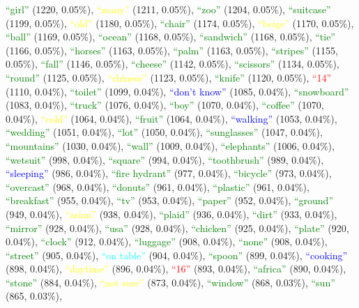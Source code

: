 {\textcolor{green}{``girl''}} (1220, 0.05\%), {\textcolor{yellow}{``many''}} (1211, 0.05\%), {\textcolor{green}{``zoo''}} (1204, 0.05\%), {\textcolor{green}{``suitcase''}} (1199, 0.05\%), {\textcolor{yellow}{``old''}} (1180, 0.05\%), {\textcolor{green}{``chair''}} (1174, 0.05\%), {\textcolor{yellow}{``beige''}} (1170, 0.05\%), {\textcolor{green}{``ball''}} (1169, 0.05\%), {\textcolor{green}{``ocean''}} (1168, 0.05\%), {\textcolor{green}{``sandwich''}} (1168, 0.05\%), {\textcolor{green}{``tie''}} (1166, 0.05\%), {\textcolor{green}{``horses''}} (1163, 0.05\%), {\textcolor{green}{``palm''}} (1163, 0.05\%), {\textcolor{green}{``stripes''}} (1155, 0.05\%), {\textcolor{green}{``fall''}} (1146, 0.05\%), {\textcolor{green}{``cheese''}} (1142, 0.05\%), {\textcolor{green}{``scissors''}} (1134, 0.05\%), {\textcolor{green}{``round''}} (1125, 0.05\%), {\textcolor{yellow}{``chinese''}} (1123, 0.05\%), {\textcolor{green}{``knife''}} (1120, 0.05\%), {\textcolor{red}{``14''}} (1110, 0.04\%), {\textcolor{green}{``toilet''}} (1099, 0.04\%), {\textcolor{blue}{``don't know''}} (1085, 0.04\%), {\textcolor{green}{``snowboard''}} (1083, 0.04\%), {\textcolor{green}{``truck''}} (1076, 0.04\%), {\textcolor{green}{``boy''}} (1070, 0.04\%), {\textcolor{green}{``coffee''}} (1070, 0.04\%), {\textcolor{yellow}{``cold''}} (1064, 0.04\%), {\textcolor{green}{``fruit''}} (1064, 0.04\%), {\textcolor{blue}{``walking''}} (1053, 0.04\%), {\textcolor{green}{``wedding''}} (1051, 0.04\%), {\textcolor{green}{``lot''}} (1050, 0.04\%), {\textcolor{green}{``sunglasses''}} (1047, 0.04\%), {\textcolor{green}{``mountains''}} (1030, 0.04\%), {\textcolor{green}{``wall''}} (1009, 0.04\%), {\textcolor{green}{``elephants''}} (1006, 0.04\%), {\textcolor{green}{``wetsuit''}} (998, 0.04\%), {\textcolor{green}{``square''}} (994, 0.04\%), {\textcolor{green}{``toothbrush''}} (989, 0.04\%), {\textcolor{blue}{``sleeping''}} (986, 0.04\%), {\textcolor{green}{``fire hydrant''}} (977, 0.04\%), {\textcolor{green}{``bicycle''}} (973, 0.04\%), {\textcolor{green}{``overcast''}} (968, 0.04\%), {\textcolor{green}{``donuts''}} (961, 0.04\%), {\textcolor{green}{``plastic''}} (961, 0.04\%), {\textcolor{green}{``breakfast''}} (955, 0.04\%), {\textcolor{green}{``tv''}} (953, 0.04\%), {\textcolor{green}{``paper''}} (952, 0.04\%), {\textcolor{green}{``ground''}} (949, 0.04\%), {\textcolor{yellow}{``asian''}} (938, 0.04\%), {\textcolor{green}{``plaid''}} (936, 0.04\%), {\textcolor{green}{``dirt''}} (933, 0.04\%), {\textcolor{green}{``mirror''}} (928, 0.04\%), {\textcolor{green}{``usa''}} (928, 0.04\%), {\textcolor{green}{``chicken''}} (925, 0.04\%), {\textcolor{green}{``plate''}} (920, 0.04\%), {\textcolor{green}{``clock''}} (912, 0.04\%), {\textcolor{green}{``luggage''}} (908, 0.04\%), {\textcolor{green}{``none''}} (908, 0.04\%), {\textcolor{green}{``street''}} (905, 0.04\%), {\textcolor{cyan}{``on table''}} (904, 0.04\%), {\textcolor{green}{``spoon''}} (899, 0.04\%), {\textcolor{blue}{``cooking''}} (898, 0.04\%), {\textcolor{yellow}{``daytime''}} (896, 0.04\%), {\textcolor{red}{``16''}} (893, 0.04\%), {\textcolor{green}{``africa''}} (890, 0.04\%), {\textcolor{green}{``stone''}} (884, 0.04\%), {\textcolor{yellow}{``not sure''}} (873, 0.04\%), {\textcolor{green}{``window''}} (868, 0.03\%), {\textcolor{green}{``sun''}} (865, 0.03\%), 